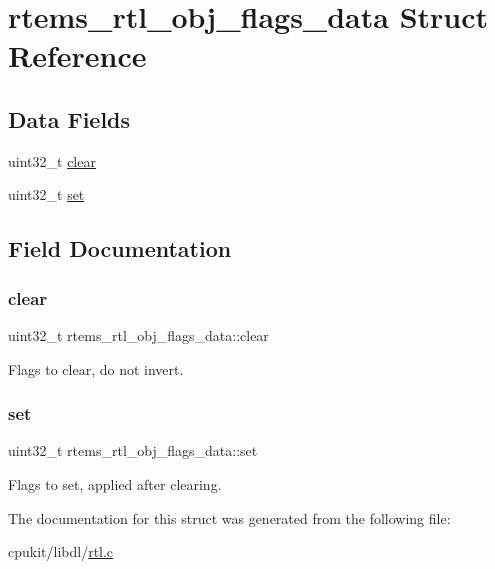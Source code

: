 \hypertarget{structrtems__rtl__obj__flags__data}{}\section{rtems\+\_\+rtl\+\_\+obj\+\_\+flags\+\_\+data Struct Reference}
\label{structrtems__rtl__obj__flags__data}
\subsection*{Data Fields}
\begin{DoxyCompactItemize}
\item 
uint32\+\_\+t \mbox{\hyperlink{structrtems__rtl__obj__flags__data_a60c544d429aecd279fd9cf32549ee40e}{clear}}
\item 
uint32\+\_\+t \mbox{\hyperlink{structrtems__rtl__obj__flags__data_a224adabcfcf41165fe7690ae37223e28}{set}}
\end{DoxyCompactItemize}


\subsection{Field Documentation}
\mbox{\label{structrtems__rtl__obj__flags__data_a60c544d429aecd279fd9cf32549ee40e}} 
\subsubsection{\texorpdfstring{clear}{clear}}
{\footnotesize\ttfamily uint32\+\_\+t rtems\+\_\+rtl\+\_\+obj\+\_\+flags\+\_\+data\+::clear}

Flags to clear, do not invert. \mbox{\label{structrtems__rtl__obj__flags__data_a224adabcfcf41165fe7690ae37223e28}} 
\subsubsection{\texorpdfstring{set}{set}}
{\footnotesize\ttfamily uint32\+\_\+t rtems\+\_\+rtl\+\_\+obj\+\_\+flags\+\_\+data\+::set}

Flags to set, applied after clearing. 

The documentation for this struct was generated from the following file\+:\begin{DoxyCompactItemize}
\item 
cpukit/libdl/\mbox{\hyperlink{rtl_8c}{rtl.\+c}}\end{DoxyCompactItemize}

